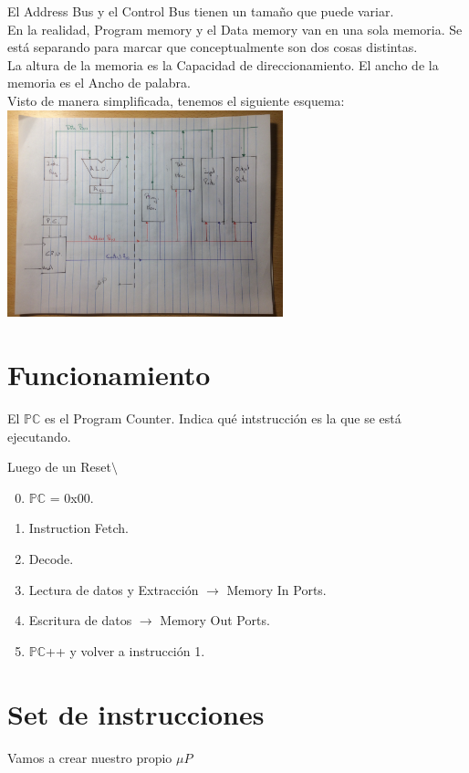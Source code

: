 \documentclass{report}
\begin{document}
El Address Bus y el Control Bus tienen un tamaño que puede variar. \\
En la realidad, Program memory y el Data memory van en una sola memoria. Se está separando para marcar que conceptualmente son dos cosas distintas.\\
La altura de la memoria es la Capacidad de direccionamiento. El ancho de la memoria es el Ancho de palabra.\\
\newpage
Visto de manera simplificada, tenemos el siguiente esquema:\\

\includegraphics[width=8cm]{../Assets/arquitectura_simplificada_uP.jpg}

\section{Funcionamiento}

El \(\mathbb{PC}\) es el Program Counter. Indica qué intstrucción es la que se está ejecutando.

Luego de un Reset\(\setminus\)
\begin{enumerate}
	\setcounter{enumi}{-1}
	\item \(\mathbb{PC}\) = 0x00.
	\item Instruction Fetch.
	\item Decode.
	\item Lectura de datos y Extracción \(\rightarrow\) Memory In Ports.
	\item Escritura de datos \(\rightarrow\) Memory Out Ports.
	\item \(\mathbb{PC}\)++ y volver a instrucción 1.
\end{enumerate}

\section{Set de instrucciones}
Vamos a crear nuestro propio \(\mu P\)
\end{document}
